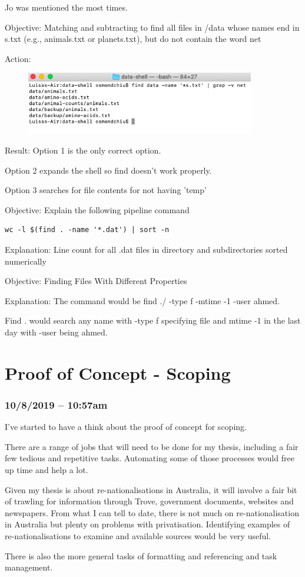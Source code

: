 \documentclass{article}
\begin{document}
Jo was mentioned the most times.

Objective: Matching and subtracting to find all files in /data whose names end in s.txt (e.g., animals.txt or planets.txt), but do not contain the word net

Action:

\begin{figure}[htp]
    \centering
    \includegraphics[width=10cm]{Screenshot25.png}
    \label{fig:ls-25}
\end{figure}

Result: Option 1 is the only correct option.

Option 2 expands the shell so find doesn't work properly.

Option 3 searches for file contents for not having 'temp'


Objective: Explain the following pipeline command

\begin{verbatim}
wc -l $(find . -name '*.dat') | sort -n    
\end{verbatim}

Explanation: Line count for all .dat files in directory and subdirectories sorted numerically


Objective: Finding Files With Different Properties

Explanation: The command would be find ./ -type f -mtime -1 -user ahmed.

Find . would search any name with -type f specifying file and mtime -1 in the last day with -user being ahmed.


\newpage

\section{Proof of Concept - Scoping}
\subsubsection*{10/8/2019 – 10:57am}
I’ve started to have a think about the proof of concept for scoping.\par
There are a range of jobs that will need to be done for my thesis, including a fair few tedious and repetitive tasks. Automating some of those processes would free up time and help a lot.\par
Given my thesis is about re-nationalisations in Australia, it will involve a fair bit of trawling for information through Trove, government documents, websites and newspapers. From what I can tell to date, there is not much on re-nationalisation in Australia but plenty on problems with privatisation. Identifying examples of re-nationalisations to examine and available sources would be very useful.\par
There is also the more general tasks of formatting and referencing and task management.
\end{document}
